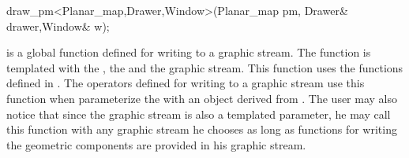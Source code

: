 
\ccRefPageBegin


\begin{ccRefFunction}{draw_pm<Planar_map,Drawer,Window>(Planar_map pm, Drawer& drawer,Window& w);}
    

\ccDefinition
{} is a global function defined for writing  to a graphic stream. 
The function is templated with the , the  and the graphic stream.  
This function uses the functions defined in .
The operators defined for writing  to a graphic stream use this function when parameterize the 
 with an object derived from . The user may also notice that since the graphic stream is also 
a templated parameter, he may call this function with any graphic stream he chooses as long as functions for writing the geometric 
components are provided in his graphic stream.

\end{ccRefFunction} %

\ccRefPageEnd











